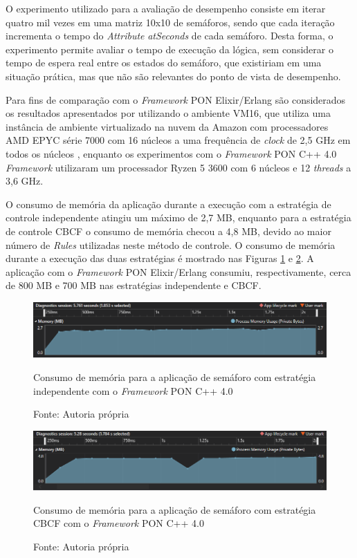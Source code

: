 \FloatBarrier

O experimento utilizado para a avaliação de desempenho consiste em iterar quatro
mil vezes em uma matriz 10x10 de semáforos, sendo que cada iteração incrementa o
tempo do \textit{Attribute} \textit{atSeconds} de cada semáforo. Desta forma, o
experimento permite avaliar o tempo de execução da lógica, sem considerar o
tempo de espera real entre os estados do semáforo, que existiriam em uma
situação prática, mas que não são relevantes do ponto de vista de desempenho.

Para fins de comparação com o \textit{Framework} PON Elixir/Erlang são
considerados os resultados apresentados por 
utilizando o ambiente VM16, que utiliza uma instância de ambiente virtualizado
na nuvem da Amazon com processadores AMD EPYC série 7000 com 16 núcleos a uma
frequência de \textit{clock} de 2,5 GHz em todos os núcleos
\cite{msc_negrini_2019}, enquanto os experimentos com o \textit{Framework} PON
C++ 4.0 \textit{Framework} utilizaram um processador Ryzen 5 3600 com 6 núcleos
e 12 \textit{threads} a 3,6 GHz.

\FloatBarrier

O consumo de memória da aplicação durante a execução com a estratégia de
controle independente atingiu um máximo de 2,7 MB, enquanto para a estratégia de
controle CBCF o consumo de memória checou a 4,8 MB, devido ao maior número de
\textit{Rules} utilizadas neste método de controle. O consumo de memória durante
a execução das duas estratégias é mostrado nas Figuras \ref{fig:mem_cta} e
\ref{fig:mem_cbcf}. A aplicação com o \textit{Framework} PON Elixir/Erlang
consumiu, respectivamente, cerca de 800 MB e 700 MB nas estratégias independente
e CBCF.

\begin{figure}[!htb]
\centering
\includegraphics[width=\textwidth]{../figures/cta_mem.png}
\caption{Consumo de memória para a aplicação de semáforo com estratégia
independente com o \textit{Framework} PON C++ 4.0}
\smallskip
\caption*{Fonte: Autoria própria}
\label{fig:mem_cta}
\end{figure}

\begin{figure}[!htb]
\centering
\includegraphics[width=\textwidth]{../figures/cbcl_mem.png}
\caption{Consumo de memória para a aplicação de semáforo com estratégia CBCF com
o \textit{Framework} PON C++ 4.0}
\smallskip
\caption*{Fonte: Autoria própria}
\label{fig:mem_cbcf}
\end{figure}

